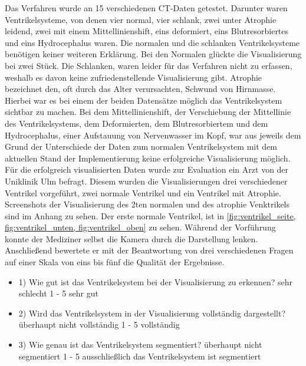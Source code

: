 Das Verfahren wurde an 15 verschiedenen CT-Daten getestet. Darunter waren Ventrikelsysteme, von denen vier normal, vier schlank, zwei unter Atrophie leidend, zwei mit einem Mittellinienshift, eins deformiert, eins Blutresorbiertes und eins Hydrocephalus waren.
Die normalen und die schlanken Ventrikelsysteme benötigen keiner weiteren Erklärung. Bei den Normalen glückte die Visualisierung bei zwei Stück. Die Schlanken, waren leider für das Verfahren nicht zu erfassen, weshalb es davon keine zufriedenstellende Visualisierung gibt. Atrophie bezeichnet den, oft durch das Alter verursachten, Schwund von Hirnmasse. Hierbei war es bei einem der beiden Datensätze möglich das Ventrikelsystem sichtbar zu machen. Bei dem Mittellinienshift, der Verschiebung der Mittellinie des Ventrikelsystems, dem Deformierten, dem Blutresorbiertem und dem Hydrocephalus, einer Aufstauung von Nervenwasser im Kopf, war aus jeweils dem Grund der Unterschiede der Daten zum normalen Ventrikelsystem mit dem aktuellen Stand der Implementierung keine erfolgreiche Visualisierung möglich.
\newline
Für die erfolgreich visualisierten Daten wurde zur Evaluation ein Arzt von der Uniklinik Ulm befragt. Diesem wurden die Visualisierungen drei verschiedener Ventrikel vorgeführt, zwei normale Ventrikel und ein Ventrikel mit Atrophie. Screenshots der Visualisierung des 2ten normalen und des atrophie Venktrikels sind im Anhang zu sehen. Der erste normale Ventrikel, ist in \autoref{fig:ventrikel_seite, fig:ventrikel_unten, fig:ventrikel_oben} zu sehen. Während der Vorführung konnte der Mediziner selbst die Kamera durch die Darstellung lenken. Anschließend bewertete er mit der Beantwortung von drei verschiedenen Fragen auf einer Skala von eins bis fünf die Qualität der Ergebnisse.
\begin{itemize}
	\item 1) Wie gut ist das Ventrikelsystem bei der Visualisierung zu erkennen? \newline sehr schlecht 1 - 5 sehr gut
	\item 2) Wird das Ventrikelsystem in der Visualisierung vollständig dargestellt? \newline überhaupt nicht vollständig 1 - 5 vollständig
	\item 3) Wie genau ist das Ventrikelsystem segmentiert? \newline überhaupt nicht segmentiert 1 - 5 ausschließlich das Ventrikelsystem ist segmentiert
\end{itemize}



